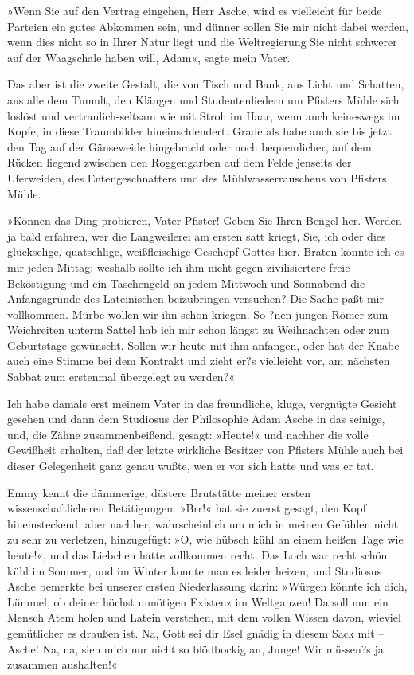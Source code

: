 »Wenn Sie auf den Vertrag eingehen, Herr Asche, wird es vielleicht
für beide Parteien ein gutes Abkommen sein, und dünner sollen Sie
mir nicht dabei werden, wenn dies nicht so in Ihrer Natur liegt und
die Weltregierung Sie nicht schwerer auf der Waagschale haben will,
Adam«, sagte mein Vater.

Das aber ist die zweite Gestalt, die von Tisch und Bank, aus Licht
und Schatten, aus alle dem Tumult, den Klängen und Studentenliedern
um Pfisters Mühle sich loslöst und vertraulich-seltsam wie mit
Stroh im Haar, wenn auch keineswegs im Kopfe, in diese Traumbilder
hineinschlendert. Grade als habe auch sie bis jetzt den Tag auf der
Gänseweide hingebracht oder noch bequemlicher, auf dem Rücken
liegend zwischen den Roggengarben auf dem Felde jenseits der
Uferweiden, des Entengeschnatters und des Mühlwasserrauschens von
Pfisters Mühle.

»Können das Ding probieren, Vater Pfister! Geben Sie Ihren Bengel
her. Werden ja bald erfahren, wer die Langweilerei am ersten satt
kriegt, Sie, ich oder dies glückselige, quatschlige, weißfleischige
Geschöpf Gottes hier. Braten könnte ich es mir jeden Mittag;
weshalb sollte ich ihm nicht gegen zivilisiertere freie Beköstigung
und ein Taschengeld an jedem Mittwoch und Sonnabend die
Anfangsgründe des Lateinischen beizubringen versuchen? Die Sache
paßt mir vollkommen. Mürbe wollen wir ihn schon kriegen. So ?nen
jungen Römer zum Weichreiten unterm Sattel hab ich mir schon längst
zu Weihnachten oder zum Geburtstage gewünscht. Sollen wir heute mit
ihm anfangen, oder hat der Knabe auch eine Stimme bei dem Kontrakt
und zieht er?s vielleicht vor, am nächsten Sabbat zum erstenmal
übergelegt zu werden?«

Ich habe damals erst meinem Vater in das freundliche, kluge,
vergnügte Gesicht gesehen und dann dem Studiosus der Philosophie
Adam Asche in das seinige, und, die Zähne zusammenbeißend, gesagt:
»Heute!« und nachher die volle Gewißheit erhalten, daß der letzte
wirkliche Besitzer von Pfisters Mühle auch bei dieser Gelegenheit
ganz genau wußte, wen er vor sich hatte und was er tat.

Emmy kennt die dämmerige, düstere Brutstätte meiner ersten
wissenschaftlicheren Betätigungen. »Brr!« hat sie zuerst gesagt,
den Kopf hineinsteckend, aber nachher, wahrscheinlich um mich in
meinen Gefühlen nicht zu sehr zu verletzen, hinzugefügt: »O, wie
hübsch kühl an einem heißen Tage wie heute!«, und das Liebchen
hatte vollkommen recht. Das Loch war recht schön kühl im Sommer,
und im Winter konnte man es leider heizen, und Studiosus Asche
bemerkte bei unserer ersten Niederlassung darin: »Würgen könnte ich
dich, Lümmel, ob deiner höchst unnötigen Existenz im Weltganzen! Da
soll nun ein Mensch Atem holen und Latein verstehen, mit dem vollen
Wissen davon, wieviel gemütlicher es draußen ist. Na, Gott sei dir
Esel gnädig in diesem Sack mit – Asche! Na, na, sieh mich nur nicht
so blödbockig an, Junge! Wir müssen?s ja zusammen aushalten!«

